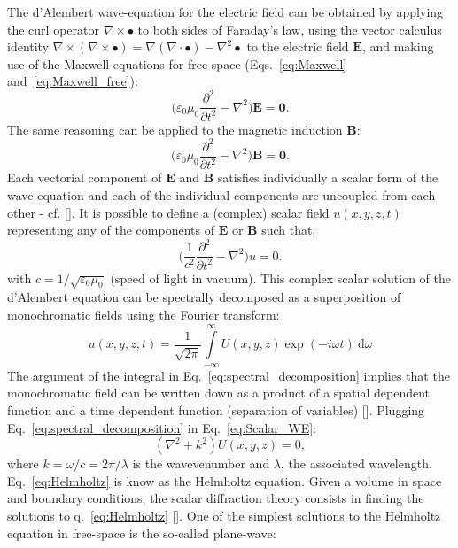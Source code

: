 \begin{refsection}
The d'Alembert wave-equation for the electric field can be obtained by applying the curl operator $\nabla\times\bullet$ to both sides of Faraday's law, using the vector calculus identity $\nabla\times(\nabla\times\bullet)=\nabla(\nabla\cdot\bullet)-\nabla^2\bullet$ to the electric field $\textbf{E}$, and making use of the Maxwell equations for free-space (Eqs.~\ref{eq:Maxwell} and~\ref{eq:Maxwell_free}):
\begin{equation}\label{eq:Evectorial_waveeq}
    \Bigg(\varepsilon_0\mu_0\frac{\partial^2}{\partial t^2} - \nabla^2\Bigg)\textbf{E}=\textbf{0}.
\end{equation}
 The same reasoning can be applied to the magnetic induction $\textbf{B}$:
\begin{equation}\label{eq:Bvectorial_waveeq}
    \Bigg(\varepsilon_0\mu_0\frac{\partial^2}{\partial t^2} - \nabla^2\Bigg)\textbf{B}=\textbf{0}.
\end{equation}
Each vectorial component of $\textbf{E}$ and $\textbf{B}$ satisfies individually a scalar form of the wave-equation and each of the individual components are uncoupled from each other - cf. [\cite[\textit{§1.1}]{Paganin2006}]. It is possible to define a (complex) scalar field $u(x,y,z,t)$ representing any of the components of $\textbf{E}$ or $\textbf{B}$ such that:
\begin{equation}\label{eq:Scalar_WE}
    \Bigg(\frac{1}{c^2}\frac{\partial^2}{\partial t^2} - \nabla^2\Bigg)u=0.
\end{equation}
with $c=1/\sqrt{\varepsilon_0\mu_0}$ (speed of light in vacuum). This complex scalar solution of the d'Alembert equation can be spectrally decomposed as a superposition of monochromatic fields using the Fourier transform:
\begin{equation}\label{eq:spectral_decomposition}
    u(x,y,z,t)=\frac{1}{\sqrt{2\pi}}\int\limits_{-\infty}^\infty{U(x,y,z)\exp{(-i\omega t)}~\mathrm{d}\omega}
\end{equation}
The argument of the integral in Eq.~\ref{eq:spectral_decomposition} implies that the monochromatic field can be written down as a product of a spatial dependent function and a time dependent function (separation of variables) [\cite[\textit{§1.2}]{Paganin2006}]. Plugging Eq.~\ref{eq:spectral_decomposition} in Eq.~\ref{eq:Scalar_WE}:
\begin{equation}\label{eq:Helmholtz}
    (\nabla^2 + k^2)U(x,y,z) = 0,
\end{equation}
where $k=\omega/c=2\pi/\lambda$ is the wavevenumber and $\lambda$, the associated wavelength. Eq.~\ref{eq:Helmholtz} is know as the Helmholtz equation. Given a volume in space and boundary conditions, the scalar diffraction theory consists in finding the solutions to q.~\ref{eq:Helmholtz} [\cite[\textit{§1.2}]{Paganin2006}]. One of the simplest solutions to the Helmholtz equation in free-space is the so-called plane-wave:

\end{refsection}
